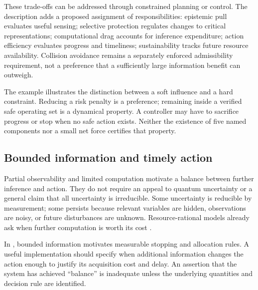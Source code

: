 These trade-offs can be addressed through constrained planning or control. The \uvif{} description adds a proposed assignment of responsibilities: epistemic pull evaluates useful sensing; selective protection regulates changes to critical representations; computational drag accounts for inference expenditure; action efficiency evaluates progress and timeliness; sustainability tracks future resource availability. Collision avoidance remains a separately enforced admissibility requirement, not a preference that a sufficiently large information benefit can outweigh.

The example illustrates the distinction between a soft influence and a hard constraint. Reducing a risk penalty is a preference; remaining inside a verified safe operating set is a dynamical property. A controller may have to sacrifice progress or stop when no safe action exists. Neither the existence of five named components nor a small net force certifies that property.

\subsection{Bounded information and timely action}
Partial observability and limited computation motivate a balance between further inference and action. They do not require an appeal to quantum uncertainty or a general claim that all uncertainty is irreducible. Some uncertainty is reducible by measurement; some persists because relevant variables are hidden, observations are noisy, or future disturbances are unknown. Resource-rational models already ask when further computation is worth its cost \citep{lieder2019resourcerational,callaway2022rational}.

In \uvif{}, bounded information motivates measurable stopping and allocation rules. A useful implementation should specify when additional information changes the action enough to justify its acquisition cost and delay. An assertion that the system has achieved ``balance'' is inadequate unless the underlying quantities and decision rule are identified.
